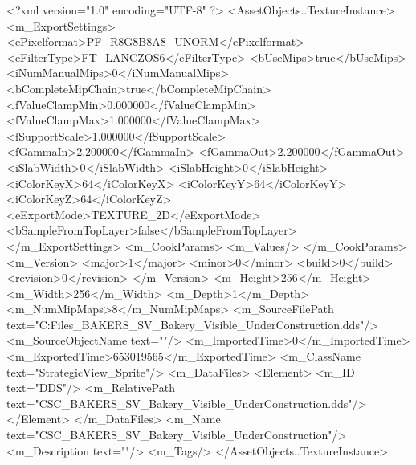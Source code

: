 <?xml version="1.0" encoding="UTF-8" ?>
<AssetObjects..TextureInstance>
	<m_ExportSettings>
		<ePixelformat>PF_R8G8B8A8_UNORM</ePixelformat>
		<eFilterType>FT_LANCZOS6</eFilterType>
		<bUseMips>true</bUseMips>
		<iNumManualMips>0</iNumManualMips>
		<bCompleteMipChain>true</bCompleteMipChain>
		<fValueClampMin>0.000000</fValueClampMin>
		<fValueClampMax>1.000000</fValueClampMax>
		<fSupportScale>1.000000</fSupportScale>
		<fGammaIn>2.200000</fGammaIn>
		<fGammaOut>2.200000</fGammaOut>
		<iSlabWidth>0</iSlabWidth>
		<iSlabHeight>0</iSlabHeight>
		<iColorKeyX>64</iColorKeyX>
		<iColorKeyY>64</iColorKeyY>
		<iColorKeyZ>64</iColorKeyZ>
		<eExportMode>TEXTURE_2D</eExportMode>
		<bSampleFromTopLayer>false</bSampleFromTopLayer>
	</m_ExportSettings>
	<m_CookParams>
		<m_Values/>
	</m_CookParams>
	<m_Version>
		<major>1</major>
		<minor>0</minor>
		<build>0</build>
		<revision>0</revision>
	</m_Version>
	<m_Height>256</m_Height>
	<m_Width>256</m_Width>
	<m_Depth>1</m_Depth>
	<m_NumMipMaps>8</m_NumMipMaps>
	<m_SourceFilePath text="C:\Users\Shadow\Desktop\Working Files\Icons\StrategicView\CSC_BAKERS_SV_Bakery_Visible_UnderConstruction.dds"/>
	<m_SourceObjectName text=""/>
	<m_ImportedTime>0</m_ImportedTime>
	<m_ExportedTime>653019565</m_ExportedTime>
	<m_ClassName text="StrategicView_Sprite"/>
	<m_DataFiles>
		<Element>
			<m_ID text="DDS"/>
			<m_RelativePath text="CSC_BAKERS_SV_Bakery_Visible_UnderConstruction.dds"/>
		</Element>
	</m_DataFiles>
	<m_Name text="CSC_BAKERS_SV_Bakery_Visible_UnderConstruction"/>
	<m_Description text=""/>
	<m_Tags/>
</AssetObjects..TextureInstance>

